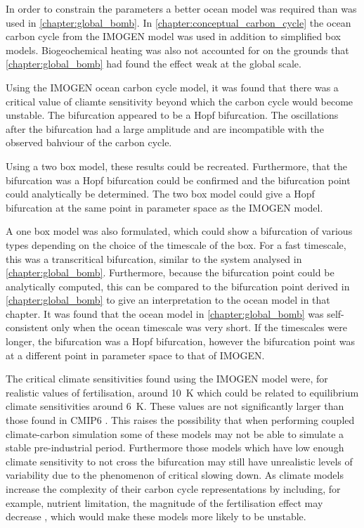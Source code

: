 In order to constrain the parameters a better ocean model was required than was used in \cref{chapter:global_bomb}. In \cref{chapter:conceptual_carbon_cycle}
the ocean carbon cycle from the IMOGEN model was used in addition to simplified box models. Biogeochemical heating was also not accounted for on the grounds
that \cref{chapter:global_bomb} had found the effect weak at the global scale.

Using the IMOGEN ocean carbon cycle model, it was found that there was a critical value of cliamte sensitivity beyond which the carbon cycle would become unstable.
The bifurcation appeared to be a Hopf bifurcation. The oscillations after the bifurcation had a large amplitude and are incompatible with the observed bahviour of the
carbon cycle.

Using a two box model, these results could be recreated. Furthermore, that the bifurcation was a Hopf bifurcation could be confirmed and the bifurcation point
could analytically be determined. The two box model could give a Hopf bifurcation at the same point in parameter space as the IMOGEN model.

A one box model was also formulated, which could show a bifurcation of various types depending on the choice of the timescale of the box.
For a fast timescale, this was a transcritical bifurcation, similar to the system analysed in \cref{chapter:global_bomb}. Furthermore, because the bifurcation
point could be analytically computed, this can be compared to the bifurcation point derived in \cref{chapter:global_bomb} to give an interpretation to the
ocean model in that chapter. It was found that the ocean model in \cref{chapter:global_bomb} was self-consistent only when the ocean timescale was very short.
If the timescales were longer, the bifurcation was a Hopf bifurcation, however the bifurcation point was at a different point in parameter space to that of IMOGEN.

The critical climate sensitivities found using the IMOGEN model were, for realistic values of  fertilisation, around \SI{10}{\kelvin} which could be
related to equilibrium climate sensitivities around \SI{6}{\kelvin}. These values are not significantly larger than those found in CMIP6 \parencite{Zelinka2020}.
This raises the possibility that when performing coupled climate-carbon simulation some of these models may not be able to simulate a stable pre-industrial
period. Furthermore those models which have low enough climate sensitivity to not cross the bifurcation may still have unrealistic levels of  variability
due to the phenomenon of critical slowing down. As climate models increase the complexity of their carbon cycle representations by including, for example,
nutrient limitation, the magnitude of the  fertilisation effect may decrease \parencite{Wiltshire2021}, which would make these models more likely to be unstable.

